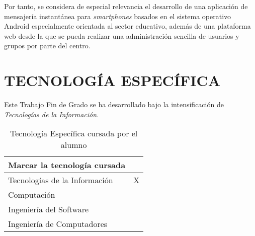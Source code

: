 \documentclass{pre-tfg}
\begin{document}
Por tanto, se considera de especial relevancia el desarrollo de una aplicación de mensajería instantánea para \textit{smartphones} basados en el sistema operativo Android especialmente orientada al sector educativo, además de una plataforma web desde la que se pueda realizar una administración sencilla de usuarios y grupos por parte del centro.

\newpage

\section{TECNOLOGÍA ESPECÍFICA}
Este Trabajo Fin de Grado se ha desarrollado bajo la intensificación de \textit{Tecnologías de la Información}.

\begin{table}[hp]
	\centering
	\caption{Tecnología Específica cursada por el alumno}
	\label{tab:tec-especifica}
	
	
	\begin{tabular}{p{}p{}}
		\textbf{Marcar la tecnología cursada} \\
		\hline
			Tecnologías de la Información & X\\
			Computación & \\
			Ingeniería del Software & \\
			Ingeniería de Computadores & \\
		\hline
	\end{tabular}

\end{table}
\end{document}
